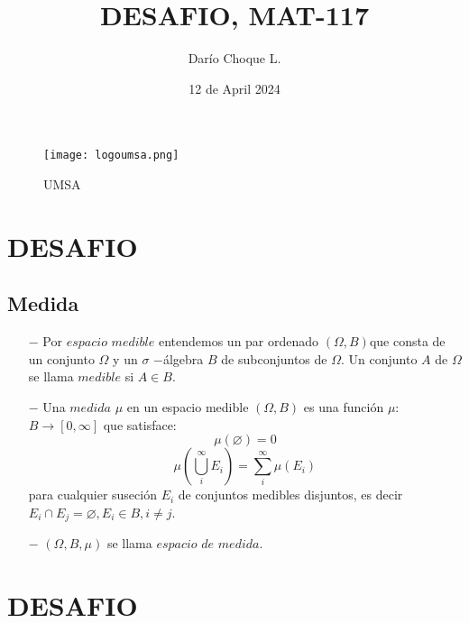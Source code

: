 \documentclass[¨12pt,letter paper]{article}
\title{DESAFIO, MAT-117}
\author{Darío Choque L.}
\date{12 de April 2024}
\begin{document}
   \begin{figure}
        \centering
        \texttt{[image: logoumsa.png]}
        \caption{UMSA}
        \label{fig:enter-label}
    \end{figure}
 \maketitle
         
     \section{DESAFIO }
         \subsection{Medida}  
               \begin{itemize}
                       \item [$-$] Por $espacio$ $medible$ entendemos un par ordenado $ (\Omega ,B)$que consta de un conjunto $\Omega$ y un $\sigma$ $-$álgebra $B$ de subconjuntos de $\Omega$. Un conjunto $A$ de $\Omega$ se llama $medible$ si $A \in B$.
                       \item [$-$] Una $medida$ $\mu$ en un espacio medible $(\Omega ,B)$ es una función $\mu$:$B \longrightarrow [0,\infty]$ que satisface:
                       $$\mu(\varnothing)=0$$
                       $$\mu(\bigcup_{i}^\infty E_i)=\sum_i^{\infty}{ \mu (E_i)}$$
                       para cualquier suseción ${E_i}$ de conjuntos medibles disjuntos, es decir $E_i \cap E_j=\varnothing,E_i \in B,i\neq j$.
                       \item [$-$] $(\Omega ,B,\mu)$ se llama $espacio$ $de$ $medida$.
                   
                       
               \end{itemize} 
                    
     \section{DESAFIO } 
        
\end{document}
